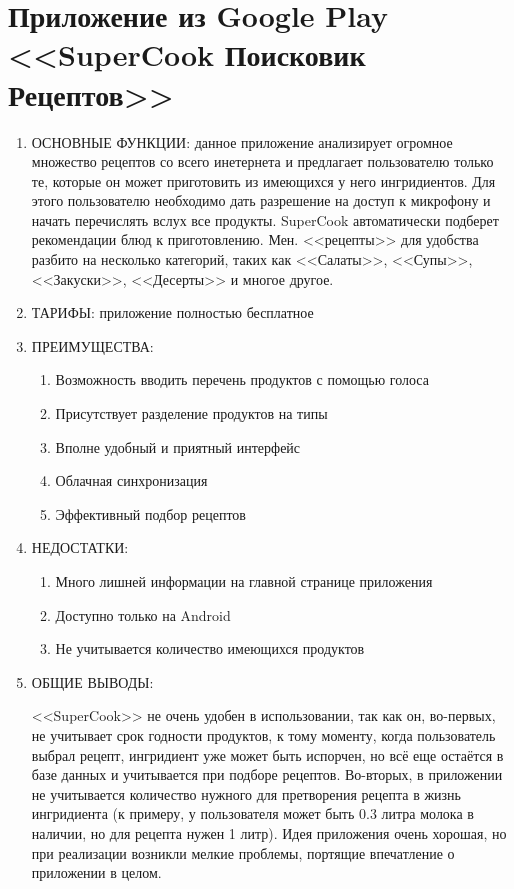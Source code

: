 \documentclass[14pt]{extreport}
\begin{document}
\section{Приложение из Google Play <<SuperCook Поисковик Рецептов>>\cite{bib3}}
\begin{enumerate}
\item ОСНОВНЫЕ ФУНКЦИИ: данное приложение анализирует огромное множество рецептов со всего инетернета и предлагает пользователю только те, которые он может приготовить из имеющихся у него ингридиентов. Для этого пользователю необходимо дать разрешение на доступ к микрофону и начать перечислять вслух все продукты. SuperCook автоматически подберет рекомендации блюд к приготовлению. Мен. <<рецепты>> для удобства разбито на несколько категорий, таких как <<Салаты>>, <<Супы>>, <<Закуски>>, <<Десерты>> и многое другое.
\item ТАРИФЫ: приложение полностью бесплатное

\item ПРЕИМУЩЕСТВА: 

\begin{enumerate}
    \item Возможность вводить перечень продуктов с помощью голоса
    \item Присутствует разделение продуктов на типы
    \item Вполне удобный и приятный интерфейс
    \item Облачная синхронизация
    \item Эффективный подбор рецептов
\end{enumerate}

\item НЕДОСТАТКИ: 
\begin{enumerate}
    \item Много лишней информации на главной странице приложения
    \item Доступно только на Android
    \item Не учитывается количество имеющихся продуктов
\end{enumerate}
\item ОБЩИЕ ВЫВОДЫ: 

<<SuperCook>> не очень удобен в использовании, так как он, во-первых, не учитывает срок годности продуктов, к тому моменту, когда пользователь выбрал рецепт, ингридиент уже может быть испорчен, но всё еще остаётся в базе данных и учитывается при подборе рецептов. Во-вторых, в приложении не учитывается количество нужного для претворения рецепта в жизнь ингридиента (к примеру, у пользователя может быть 0.3 литра молока в наличии, но для рецепта нужен 1 литр).  Идея приложения очень хорошая, но при реализации возникли мелкие проблемы, портящие впечатление о приложении в целом.
\end{enumerate}
\newpage
\end{document}
